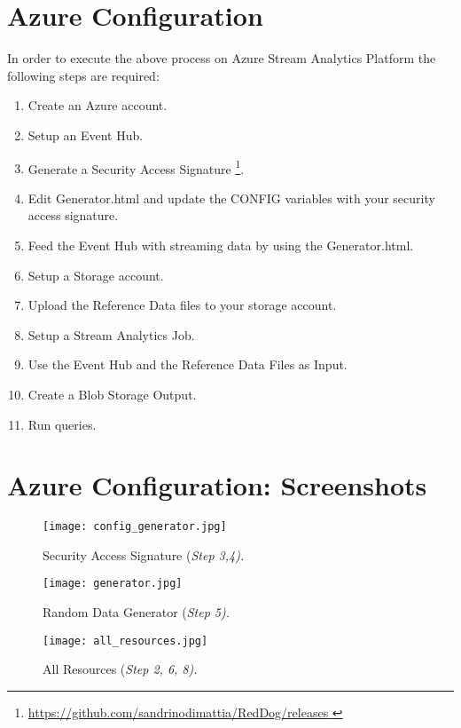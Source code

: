 \documentclass[12pt]{report}
\begin{document}
{\section{Azure Configuration}
In order to execute the above process on Azure Stream Analytics Platform the following steps are required:
\begin{enumerate}
    	\item Create an Azure account.
        \item Setup an Event Hub.
        \item Generate a Security Access Signature \footnote{\url{https://github.com/sandrinodimattia/RedDog/releases }}.
        \item Edit Generator.html and update the CONFIG variables with your security access signature.
        \item Feed the Event Hub with streaming data by using the 				Generator.html.
        \item Setup a Storage account.
        \item Upload the Reference Data files to your storage account.
        \item Setup a Stream Analytics Job.
        \item Use the Event Hub and the Reference Data Files as Input.
        \item Create a Blob Storage Output.
        \item Run queries.

\end{enumerate}
\newpage

\section{Azure Configuration: Screenshots}

\begin{figure}[H]
	\texttt{[image: config\_generator.jpg]}
	\caption{Security Access Signature (\textit{Step 3,4).}}
\end{figure}

\begin{figure}[H]
	\texttt{[image: generator.jpg]}
	\caption{Random Data Generator (\textit{Step 5).}}
\end{figure}


\begin{figure}[H]
	\texttt{[image: all\_resources.jpg]}
	\caption{All Resources (\textit{Step 2, 6, 8).}}
\end{figure}

}
\end{document}
